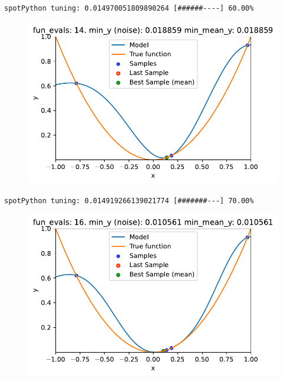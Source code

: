 \documentclass[
  letterpaper,
  DIV=11,
  numbers=noendperiod]{scrreprt}
\begin{document}
\begin{verbatim}
spotPython tuning: 0.014970051809890264 [######----] 60.00% 
\end{verbatim}

\begin{figure}[H]

{\centering \includegraphics{013_num_spot_noisy_files/figure-pdf/cell-10-output-8.pdf}

}

\end{figure}

\begin{verbatim}
spotPython tuning: 0.014919266139021774 [#######---] 70.00% 
\end{verbatim}

\begin{figure}[H]

{\centering \includegraphics{013_num_spot_noisy_files/figure-pdf/cell-10-output-10.pdf}

}

\end{figure}
\end{document}
